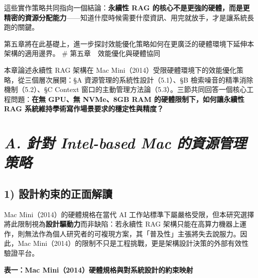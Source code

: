 這些實作策略共同指向一個結論：\textbf{永續性 RAG
的核心不是更強的硬體，而是更精密的資源分配能力}------知道什麼時候需要什麼資訊、用完就放手，才是讓系統長跑的關鍵。

第五章將在此基礎上，進一步探討效能優化策略如何在更廣泛的硬體環境下延伸本架構的適用邊界。
\# 第五章　效能優化與硬體協同

本章論述永續性 RAG 架構在 Mac
Mini（2014）受限硬體環境下的效能優化策略，從三個層次展開：§A
資源管理的系統性設計（5.1）、§B 檢索噪音的精準消除機制（5.2）、§C
Context
窗口的主動管理方法論（5.3）。三節共同回答一個核心工程問題：\textbf{在無
GPU、無 NVMe、8GB RAM 的硬體限制下，如何讓永續性 RAG
系統維持學術寫作場景要求的穩定性與精度？}

\section{\texorpdfstring{\emph{A. 針對 Intel-based Mac
的資源管理策略}}{A. 針對 Intel-based Mac 的資源管理策略}}\label{a.-ux91ddux5c0d-intel-based-mac-ux7684ux8cc7ux6e90ux7ba1ux7406ux7b56ux7565}

\subsection{1)
設計約束的正面解讀}\label{ux8a2dux8a08ux7d04ux675fux7684ux6b63ux9762ux89e3ux8b80}

Mac Mini（2014）的硬體規格在當代 AI
工作站標準下屬嚴格受限，但本研究選擇將此限制視為\textbf{設計驅動力}而非缺陷：若永續性
RAG
架構只能在高算力機器上運作，則無法作為個人研究者的可複現方案，其「普及性」主張將失去說服力。因此，Mac
Mini（2014）的限制不只是工程挑戰，更是架構設計決策的外部有效性驗證平台。

\textbf{表一：Mac Mini（2014）硬體規格與對系統設計的約束映射}


